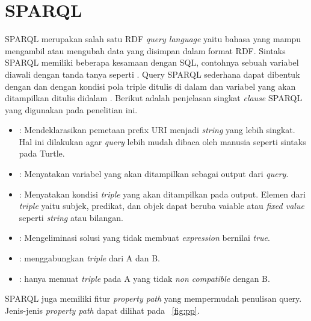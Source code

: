 \section{SPARQL}
\label{sec:sparql}

SPARQL merupakan salah satu RDF \textit{query language} yaitu bahasa yang mampu mengambil atau
mengubah data yang disimpan dalam format RDF. Sintaks SPARQL memiliki beberapa kesamaan dengan SQL,
contohnya sebuah variabel diawali dengan tanda tanya seperti . Query SPARQL sederhana
dapat dibentuk dengan  dan  dengan kondisi pola triple ditulis di dalam
 dan variabel yang akan ditampilkan ditulis didalam \citep{owlizr}. Berikut
adalah penjelasan singkat \textit{clause} SPARQL yang digunakan pada penelitian ini.

\begin{itemize}
  \itemsep1pt\parskip0pt
  \item {}: Mendeklarasikan pemetaan prefix URI menjadi \textit{string} yang lebih
        singkat. Hal ini dilakukan agar \textit{query} lebih mudah dibaca oleh manusia seperti sintaks
         pada Turtle.
  \item {}: Menyatakan variabel yang akan ditampilkan sebagai output dari \textit{query}.
  \item {}: Menyatakan kondisi \textit{triple} yang akan ditampilkan pada output. Elemen
        dari \textit{triple} yaitu subjek, predikat, dan objek dapat beruba vaiable atau
        \textit{fixed value} seperti \textit{string} atau bilangan.
  \item {}: Mengeliminasi solusi yang tidak membuat \textit{expression} bernilai
        \textit{true}.
  \item {}:  menggabungkan \textit{triple} dari A dan B.
  \item {}:  hanya memuat \textit{triple} pada A yang tidak
        \textit{non compatible} dengan B.
\end{itemize}

SPARQL juga memiliki fitur \textit{property path} yang mempermudah penulisan query. Jenis-jenis
\textit{property path} dapat dilihat pada \pic~\ref{fig:pp}.

